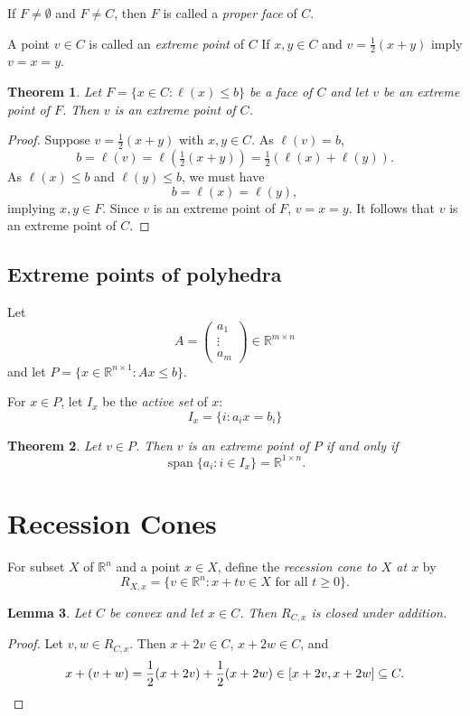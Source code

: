 \documentclass[12pt]{amsart}
\newtheorem{theorem}{Theorem}[section]
\newtheorem{lemma}[theorem]{Lemma}
\theoremstyle{definition}
\theoremstyle{remark}
\numberwithin{equation}{section}
\newcommand{\RR}{\mathbb{R}}
\DeclareMathOperator{\spn}{span}
\begin{document}
If $F\neq\emptyset$ and $F\neq C$, then $F$ is called a
\emph{proper face} of $C$.

A point $v\in C$ is called an \emph{extreme point} of $C$ If
$x, y\in C$ and $v=\frac12(x+y)$ imply $v=x=y$.

\begin{theorem}
    Let $F = \{x\in C : \ell(x)\leq b\}$ be a face of $C$
    and let $v$ be an extreme point of $F$.
    Then $v$ is an extreme point of $C$.
\end{theorem}

\begin{proof}
    Suppose $v=\frac12(x+y)$ with $x,y\in C$.
    As $\ell(v)=b$,
    \[
        b = \ell(v) = \ell(\tfrac12(x+y)) = \tfrac12(\ell(x)+\ell(y)).
    \]
    As $\ell(x)\leq b$ and $\ell(y)\leq b$, we must have
    \[
        b=\ell(x)=\ell(y),
    \]
    implying $x,y\in F$.
    Since $v$ is an extreme point of $F$, $v=x=y$.
    It follows that $v$ is an extreme point of $C$.
\end{proof}

\subsection{Extreme points of polyhedra}

Let
\[
    A = \begin{pmatrix}a_1\\\vdots\\a_m\end{pmatrix}
    \in\RR^{m\times n}
\]
and let $P=\{x\in\RR^{n\times 1}:Ax\leq b\}$.

For $x\in P$, let $I_x$ be the \emph{active set} of $x$:
\[
    I_x = \{i : a_ix=b_i\}
\]

\begin{theorem}
    Let $v\in P$.
    Then $v$ is an extreme point of $P$ if and only if
    \[
        \spn\{a_i: i\in I_x\}=\RR^{1\times n}.
    \]
\end{theorem}

\section{Recession Cones}

For subset $X$ of $\RR^n$ and a point $x\in X$, define the
\emph{recession cone to $X$ at $x$} by
\[
    R_{X,x} =
    \{v\in\RR^n : \text{$x + tv\in X$ for all $t\geq 0$}\}.
\]

\begin{lemma}
    Let $C$ be convex and let $x\in C$.
    Then $R_{C,x}$ is closed under addition.
\end{lemma}
\begin{proof}
    Let $v, w\in R_{C, x}$. Then $x+2v\in C$, $x+2w\in C$, and
    \[
        x + (v+w) = \frac12(x + 2v) + \frac12(x + 2w)
        \in [x+2v, x+2w]\subseteq C.\qedhere
    \]
\end{proof}
\end{document}
